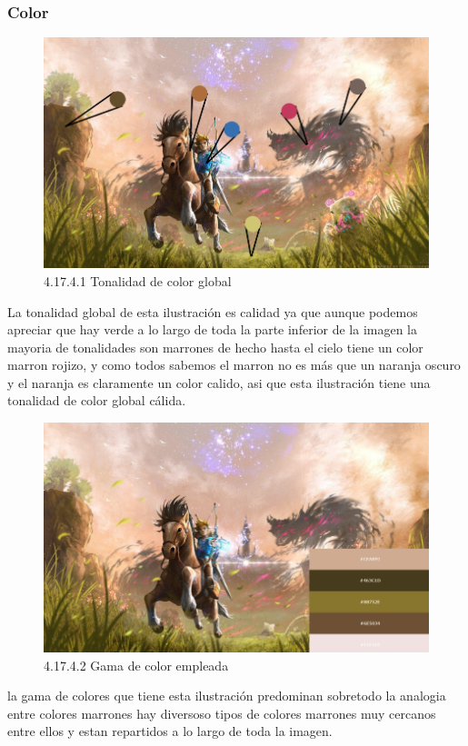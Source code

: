 \documentclass[12pt]{article}
\begin{document}
      \subsubsection{Color}


        \begin{figure}[H]
          \centering
          \includegraphics[scale=0.7]{images/Saúl/Sección 17/EA_img17_4Color_1TonalidadGenral.png}
          \caption{\small 4.17.4.1 Tonalidad de color global}
        \end{figure}
        La tonalidad global de esta ilustración es calidad ya que aunque podemos apreciar que hay verde a lo largo de toda la parte inferior de la imagen la mayoria de tonalidades son marrones de hecho hasta el cielo tiene un color marron rojizo, y como todos sabemos el marron no es más que un naranja oscuro y el naranja es claramente un color calido, asi que esta ilustración tiene una tonalidad de color global cálida.


        \begin{figure}[H]
          \centering
          \includegraphics[scale=0.7]{images/Saúl/Sección 17/EA_img17_4Color_2GamaColores.png}
          \caption{\small 4.17.4.2 Gama de color empleada}
        \end{figure}
        la gama de colores que tiene esta ilustración predominan sobretodo la analogia entre colores marrones hay diversoso tipos de colores marrones muy cercanos entre ellos y estan repartidos a lo largo de toda la imagen.
\end{document}
